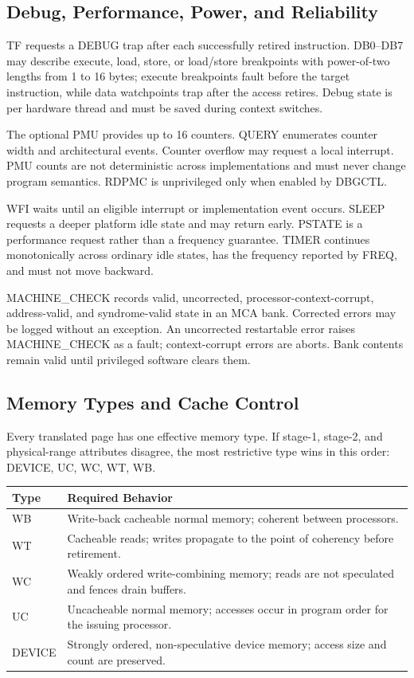 \documentclass[11pt]{article}
\begin{document}
\subsection{Debug, Performance, Power, and Reliability}

TF requests a DEBUG trap after each successfully retired instruction. DB0--DB7 may describe execute, load, store, or load/store breakpoints with power-of-two lengths from 1 to 16 bytes; execute breakpoints fault before the target instruction, while data watchpoints trap after the access retires. Debug state is per hardware thread and must be saved during context switches.

The optional PMU provides up to 16 counters. QUERY enumerates counter width and architectural events. Counter overflow may request a local interrupt. PMU counts are not deterministic across implementations and must never change program semantics. RDPMC is unprivileged only when enabled by DBGCTL.

WFI waits until an eligible interrupt or implementation event occurs. SLEEP requests a deeper platform idle state and may return early. PSTATE is a performance request rather than a frequency guarantee. TIMER continues monotonically across ordinary idle states, has the frequency reported by FREQ, and must not move backward.

MACHINE\_CHECK records valid, uncorrected, processor-context-corrupt, address-valid, and syndrome-valid state in an MCA bank. Corrected errors may be logged without an exception. An uncorrected restartable error raises MACHINE\_CHECK as a fault; context-corrupt errors are aborts. Bank contents remain valid until privileged software clears them.

\subsection{Memory Types and Cache Control}

Every translated page has one effective memory type. If stage-1, stage-2, and physical-range attributes disagree, the most restrictive type wins in this order: DEVICE, UC, WC, WT, WB.

\begin{table}[h]
\centering
\begin{tabular}{@{}L{1.7cm}L{10.2cm}@{}}
\toprule
\textbf{Type} & \textbf{Required Behavior} \\ \midrule
WB & Write-back cacheable normal memory; coherent between processors. \\
WT & Cacheable reads; writes propagate to the point of coherency before retirement. \\
WC & Weakly ordered write-combining memory; reads are not speculated and fences drain buffers. \\
UC & Uncacheable normal memory; accesses occur in program order for the issuing processor. \\
DEVICE & Strongly ordered, non-speculative device memory; access size and count are preserved. \\ \bottomrule
\end{tabular}
\end{table}
\end{document}
